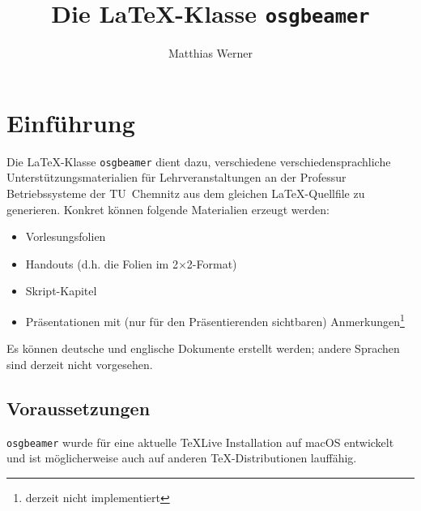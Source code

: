 \documentclass[10pt]{scrreprt}
\author{Matthias Werner}
\title{Die \LaTeX-Klasse \texttt{osgbeamer}}
\date{}
\newcommand{\osg}{\texttt{osgbeamer}\xspace}
\begin{document}
\maketitle

\chapter{Einführung}
Die \LaTeX-Klasse \osg dient dazu, verschiedene verschiedensprachliche Unterstützungsmaterialien für
Lehrveranstaltungen an der Professur Betriebssysteme der TU~Chemnitz aus dem
gleichen \LaTeX-Quellfile zu generieren.
Konkret können folgende Materialien erzeugt werden:
\begin{itemize}
  \item Vorlesungsfolien
  \item Handouts (d.h. die Folien im 2$\times$2-Format)
  \item Skript-Kapitel
  \item Präsentationen mit (nur für den Präsentierenden sichtbaren)
  Anmerkungen\footnote{derzeit nicht implementiert}
\end{itemize}
Es können deutsche und englische Dokumente erstellt werden; andere Sprachen
sind derzeit nicht vorgesehen.

\section{Voraussetzungen}
\osg wurde für eine aktuelle \TeX Live Installation auf macOS entwickelt und
ist möglicherweise auch auf anderen \TeX-Distributionen lauffähig. 
\end{document}
